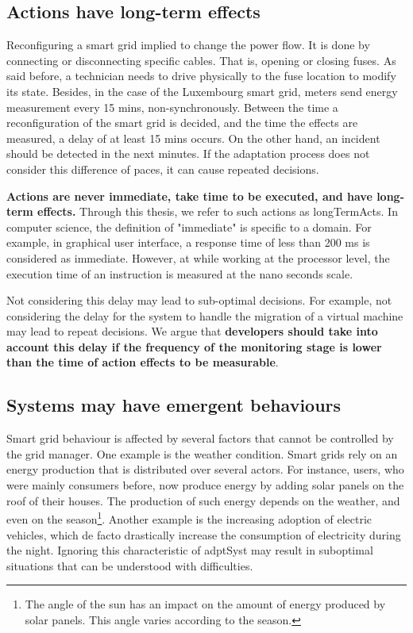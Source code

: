 \subsection{Actions have long-term effects}
Reconfiguring a smart grid implied to change the power flow.
It is done by connecting or disconnecting specific cables.
That is, opening or closing fuses.
As said before, a technician needs to drive physically to the fuse location to modify its state.
Besides, in the case of the Luxembourg smart grid, meters send energy measurement every 15 mins, non-synchronously.
Between the time a reconfiguration of the smart grid is decided, and the time the effects are measured, a delay of at least 15 mins occurs.
On the other hand, an incident should be detected in the next minutes.
If the adaptation process does not consider this difference of paces, it can cause repeated decisions.

\textbf{Actions are never immediate, take time to be executed, and have long-term effects.}
Through this thesis, we refer to such actions as \glspl{longTermAct}.
In computer science, the definition of "immediate" is specific to a domain.
For example, in graphical user interface, a response time of less than 200 ms is considered as immediate.
However, at while working at the processor level, the execution time of an instruction is measured at the nano seconds scale.

Not considering this delay may lead to sub-optimal decisions.
For example, not considering the delay for the system to handle the migration of a virtual machine may lead to repeat decisions.
We argue that \textbf{developers should take into account this delay if the frequency of the monitoring stage is lower than the time of action effects to be measurable}.

\subsection{Systems may have emergent behaviours}
Smart grid behaviour is affected by several factors that cannot be controlled by the grid manager.
One example is the weather condition.
Smart grids rely on an energy production that is distributed over several actors.
For instance, users, who were mainly consumers before, now produce energy by adding solar panels on the roof of their houses.
The production of such energy depends on the weather, and even on the season\footnote{The angle of the sun has an impact on the amount of energy produced by solar panels. This angle varies according to the season.}.
Another example is the increasing adoption of electric vehicles, which de facto drastically increase the consumption of electricity during the night.
Ignoring this characteristic of \gls{adptSyst} may result in suboptimal situations that can be understood with difficulties.

